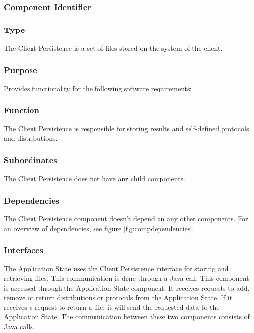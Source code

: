 \subsubsection*{Component Identifier}
\RTMCCP{}

\subsubsection*{Type}
The Client Persistence is a set of files stored on the system of the client.

\subsubsection*{Purpose}
Provides functionality for the following software requirements:

\noindent {}

\subsubsection*{Function}
The Client Persistence is responsible for storing results and self-defined protocols and distributions.

\subsubsection*{Subordinates}
The Client Persistence does not have any child components.

\subsubsection*{Dependencies}
The Client Persistence component doesn't depend on any other components. For an overview of dependencies, see figure \ref{fig:compdependencies}.

\subsubsection*{Interfaces}
The Application State uses the Client Persistence interface for storing and retrieving files. This communication is done through a Java-call.
This component is accessed through the Application State component. It receives requests to add, remove or return distributions or protocols from the Application State. If it receives a request to return a file, it will send the requested data to the Application State. The communication between these two components consists of Java calls.

